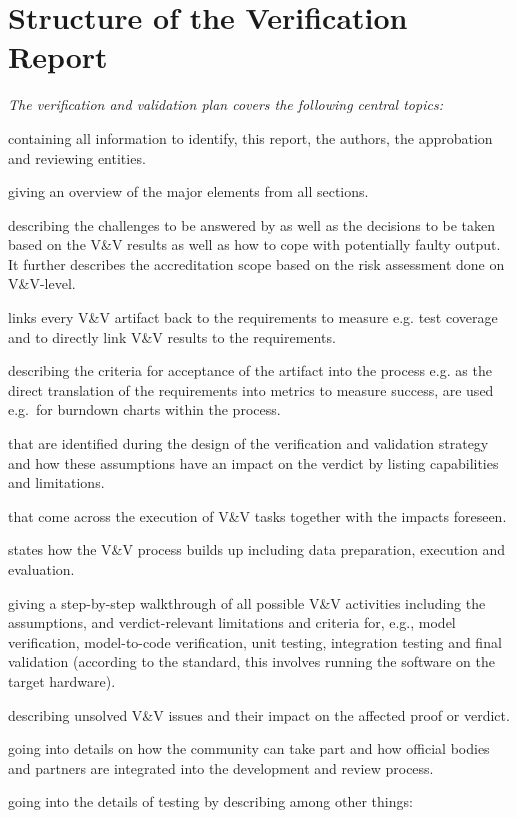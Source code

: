 \documentclass{template/openetcs_report}
\begin{document}



\section{Structure of the Verification Report}
\label{sec:structure-vv-plan}

{\it
The verification and validation plan covers the following central topics:
\begin{description}\setlength{\parsep}{0pt}\setlength{\itemsep}{0pt}\setlength{\topsep}{0pt}
\item[Header] containing all information to identify, this report, the
  authors, the approbation and reviewing entities.
\item[Executive Summary] giving an overview of the major elements from
  all sections. 
\item[Problem Statement] describing the challenges to be answered by
  \VV as well as the decisions to be taken based on the V\&V results
  as well as how to cope with potentially faulty output. It further
  describes the accreditation scope based on the risk assessment done
  on V\&V-level. 
\item[V\&V Requirements Traceability Matrix] links every V\&V artifact
  back to the requirements to measure e.g. test coverage and to
  directly link V\&V results to the requirements. 
\item[Acceptability Criteria,] describing the criteria for acceptance
  of the artifact into the \VV process e.g. as the direct translation
  of the requirements into metrics to measure success, are used
  e.g.\ for burndown charts within the process. 
\item[Assumptions] that are identified during the design of the
  verification and validation strategy and how these assumptions have
  an impact on the verdict by listing capabilities and limitations. 
\item[Risks and Impacts] that come across the execution of V\&V tasks
  together with the impacts foreseen. 
\item[V\&V Design] states how the V\&V process builds up including
  data preparation, execution and evaluation. 
\item[V\&V Methodologies] giving a step-by-step walkthrough of all
  possible V\&V activities including the assumptions, and
  verdict-relevant limitations and criteria for, e.g.,  model
  verification, model-to-code verification, unit testing, integration
  testing and final validation (according to the standard, this
  involves running the software on the target hardware).  
\item[V\&V Issues] describing unsolved V\&V issues and their impact on
  the affected proof or verdict. 
\item[Peer Reviews] going into details on how the community can take
  part and how official bodies and partners are integrated into the
  development and review process. 
\item[Test Plan Definition] going into the details of testing by
  describing among other things: 


\end{description}}
\end{document}
